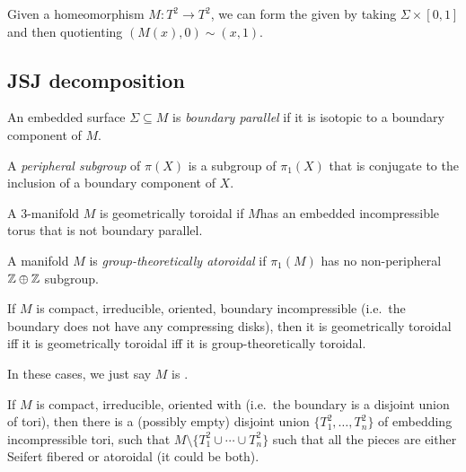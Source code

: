 \documentclass[a4paper]{article}
\begin{document}
Given a homeomorphism $M: T^2 \to T^2$, we can form the  given by taking $\Sigma \times [0, 1]$ and then quotienting $(M(x), 0) \sim (x, 1)$. %

\subsection{JSJ decomposition}
\begin{defi}
  An embedded surface $\Sigma \subseteq M$ is \emph{boundary parallel} if it is isotopic to a boundary component of $M$.
\end{defi}

\begin{defi}
  A \emph{peripheral subgroup} of $\pi(X)$ is a subgroup of $\pi_1(X)$ that is conjugate to the inclusion of a boundary component of $X$.
\end{defi}

\begin{defi}
  A $3$-manifold $M$ is geometrically toroidal if $M$has an embedded incompressible torus that is not boundary parallel.
\end{defi}

\begin{defi}
  A manifold $M$ is \emph{group-theoretically atoroidal} if $\pi_1(M)$ has no non-peripheral $\mathbb{Z} \oplus \mathbb{Z}$ subgroup.
\end{defi}

\begin{thm}[Apanasov]
  If $M$ is compact, irreducible, oriented, boundary incompressible (i.e.\ the boundary does not have any compressing disks), then it is geometrically toroidal iff it is geometrically toroidal iff it is group-theoretically toroidal.
\end{thm}
In these cases, we just say $M$ is .

\begin{thm}
  If $M$ is compact, irreducible, oriented with  (i.e.\ the boundary is a disjoint union of tori), then there is a (possibly empty) disjoint union $\{T_1^2, \ldots, T_n^2\}$ of embedding incompressible tori, such that $M \setminus \{T_1^2 \cup \cdots \cup T_n^2\}$ such that all the pieces are either Seifert fibered or atoroidal (it could be both).
\end{thm}
\end{document}
